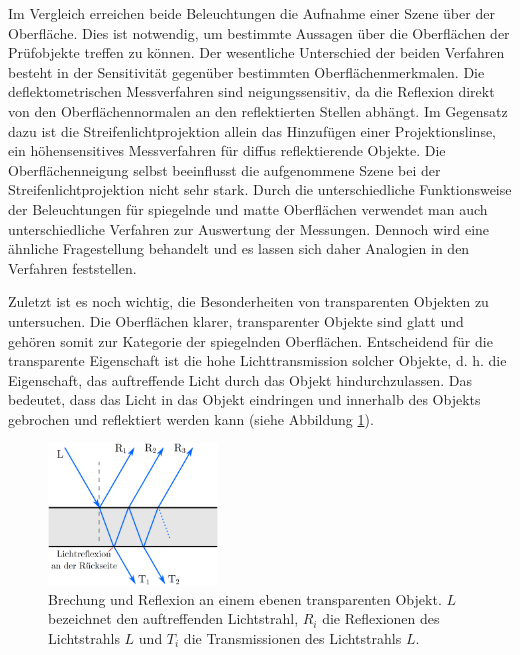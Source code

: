 \noindent
Im Vergleich erreichen beide Beleuchtungen die Aufnahme einer Szene über der Oberfläche.
Dies ist notwendig, um bestimmte Aussagen über die Oberflächen der Prüfobjekte treffen zu können.
Der wesentliche Unterschied der beiden Verfahren besteht in der Sensitivität gegenüber bestimmten Oberflächenmerkmalen.
Die deflektometrischen Messverfahren sind neigungssensitiv, da die Reflexion direkt von den Oberflächennormalen an den reflektierten Stellen abhängt.
Im Gegensatz dazu ist die Streifenlichtprojektion allein das Hinzufügen einer Projektionslinse, ein höhensensitives Messverfahren für diffus reflektierende Objekte.
Die Oberflächenneigung selbst beeinflusst die aufgenommene Szene bei der Streifenlichtprojektion nicht sehr stark.
Durch die unterschiedliche Funktionsweise der Beleuchtungen für spiegelnde und matte Oberflächen verwendet man auch unterschiedliche Verfahren zur Auswertung der Messungen.
Dennoch wird eine ähnliche Fragestellung behandelt und es lassen sich daher Analogien in den Verfahren feststellen.

\p
Zuletzt ist es noch wichtig, die Besonderheiten von transparenten Objekten zu untersuchen.
Die Oberflächen klarer, transparenter Objekte sind glatt und gehören somit zur Kategorie der spiegelnden Oberflächen.
Entscheidend für die transparente Eigenschaft ist die hohe Lichttransmission solcher Objekte, d. h. die Eigenschaft, das auftreffende Licht durch das Objekt hindurchzulassen.
Das bedeutet, dass das Licht in das Objekt eindringen und innerhalb des Objekts gebrochen und reflektiert werden kann (siehe Abbildung \ref{img:rueckseitenreflex}).

\begin{figure}[H]
	\centering
	\includegraphics[width=0.4\textwidth]{02_grundlagenDerDeflektometrie/spiegelndeOberflaechen/figures/rueckseitenreflex}
	\caption[Rückseitenreflex]{Brechung und Reflexion an einem ebenen transparenten Objekt. $L$ bezeichnet den auftreffenden Lichtstrahl, $R_i$ die Reflexionen des Lichtstrahls $L$ und $T_i$ die Transmissionen des Lichtstrahls $L$. \cite{deflektometrieScheiben}}
	\label{img:rueckseitenreflex}
\end{figure}

